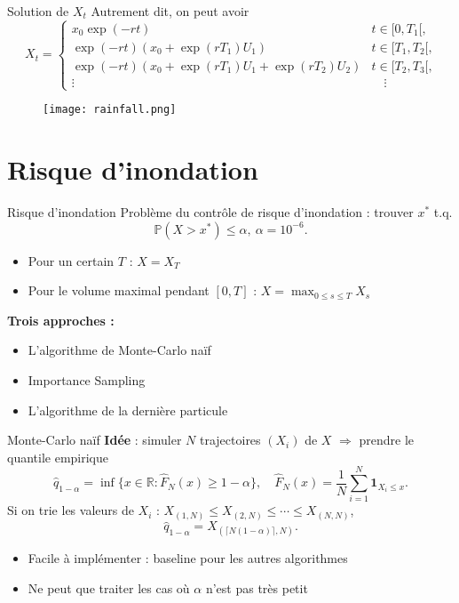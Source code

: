 \documentclass{beamer}
\def \P {\mathbb{P}}
\begin{document}
\begin{frame}{Solution de $X_t$}
Autrement dit, on peut avoir 
\[X_t = \begin{cases}x_0\exp(-r t)&\textrm{$t\in [0, T_1[$,}\\
  \exp(-r t)(x_0+\exp(r T_1)U_1)&\textrm{$t\in [T_1, T_2[$,}\\
  \exp(-r t)(x_0+\exp(r T_1)U_1+\exp(r T_2)U_2)&\textrm{$t\in [T_2, T_3[$,}\\
  \vdots &\quad\vdots\end{cases}\]
\pause

    \begin{figure}[t]
  \centering
  \texttt{[image: rainfall.png]}
  \caption{}
\end{figure}
\end{frame}

\section{Risque d’inondation}
\begin{frame}{Risque d’inondation}
    Problème du contrôle de risque d’inondation : trouver $x^\ast$ t.q.
    \[\P(X>x^\ast)\le \alpha,\ \alpha=10^{-6}.\]
    \begin{itemize}
        \item Pour un certain $T$ : $X=X_T$
        \item Pour le volume maximal pendant $[0,T]$ : $X=\max_{0\le s\le T}X_s$
    \end{itemize}
    \pause
    \textbf{Trois approches :}
    \begin{itemize}
        \item L'algorithme de Monte-Carlo naïf
        \item Importance Sampling
        \item L'algorithme de la dernière particule
    \end{itemize}
\end{frame}

\begin{frame}{Monte-Carlo naïf}
    \textbf{Idée} : simuler $N$ trajectoires $(X_i)$ de $X$ $\Longrightarrow$ prendre le quantile empirique
    \[\hat{q}_{1-\alpha} = \inf\{x\in \mathbb{R}:\hat{F}_N(x)\geq 1-\alpha\},\quad \hat{F}_N(x) = \frac{1}{N}\sum_{i=1}^N \mathbf{1}_{X_i\leq x}.\]
    Si on trie les valeurs de $X_i$ : $X_{(1,N)}\leq X_{(2,N)}\leq \cdots \leq X_{(N,N)}$, 
\[\hat{q}_{1-\alpha} = X_{(\lceil N(1-\alpha)\rceil,N)}.\]
\pause
\begin{itemize}
    \item Facile à implémenter : baseline pour les autres algorithmes
    \item Ne peut que traiter les cas où $\alpha$ n'est pas très petit
\end{itemize}
\end{frame}
\end{document}
